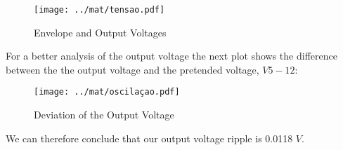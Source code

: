 \begin{figure}[H] \centering
\texttt{[image: ../mat/tensao.pdf]}
\caption{Envelope and Output Voltages}
\label{fig:tensaoF}
\end{figure}

For a better analysis of the output voltage the next plot shows the difference between the the output voltage and the pretended voltage, $V5-12$:

\begin{figure}[H] \centering
\texttt{[image: ../mat/oscilaçao.pdf]}
\caption{Deviation of the Output Voltage}
\label{fig:desvio}
\end{figure}

We can therefore conclude that our output voltage ripple is 0.0118 $V$.



